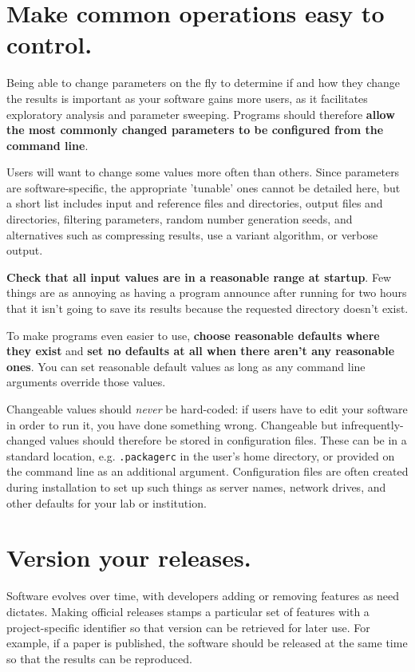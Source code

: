 \documentclass[10pt,letterpaper]{article}
\begin{document}
\section{Make common operations easy to control.}

Being able to change parameters on the fly to determine if and how
they change the results is important as your software gains more users,
as it facilitates exploratory analysis and parameter sweeping.
Programs should therefore
\textbf{allow the most commonly changed parameters to be configured from the command line}.

Users will want to change some values more often than others.
Since parameters are software-specific, the appropriate 'tunable' ones cannot be detailed here,
but a short list includes input and reference files and directories,
output files and directories,
filtering parameters,
random number generation seeds,
and
alternatives such as compressing results,
use a variant algorithm,
or verbose output.

\textbf{Check that all input values are in a reasonable range at startup}. 
Few things are as annoying as having a program announce after running for two
hours that it isn't going to save its results because the requested directory
doesn't exist.

To make programs even easier to use,
\textbf{choose reasonable defaults where they exist}
and \textbf{set no defaults at all when there aren't any reasonable ones}.
You can set reasonable default values
as long as any command line arguments
override those values.

Changeable values should \emph{never} be hard-coded:
if users have to edit your software in order to run it,
you have done something wrong.
Changeable but infrequently-changed values should therefore be stored in configuration files.
These can be in a standard location,
e.g. \texttt{.packagerc} in the user's home directory,
or provided on the command line as an additional argument.
Configuration files are often created during installation
to set up such things as server names,
network drives,
and other defaults for your lab or institution. 

\section{Version your releases.}

Software evolves over time, with developers adding or removing features as need
dictates. Making official releases stamps a particular set of features with a
project-specific identifier so that version can be retrieved for later use. For
example, if a paper is published, the software should be released at the same
time so that the results can be reproduced. 
\end{document}
